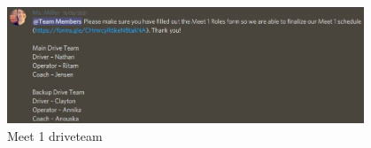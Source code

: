 \begin{figure}[htp]
\centering
\includegraphics[width=0.95\textwidth, angle=0]{Meetings/November/11-04-21/11-4-21_Team_Figure3 - Nathan Forrer.JPG}
\caption{Meet 1 driveteam}
\label{fig:pic3}
\end{figure}


